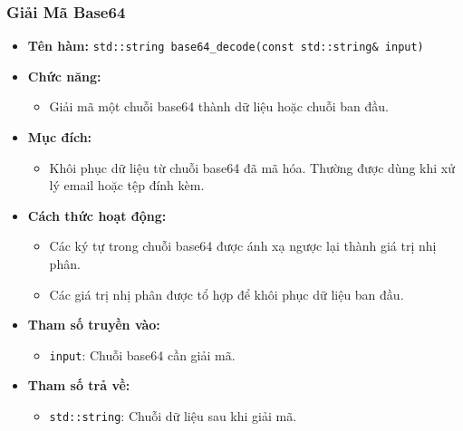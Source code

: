 \subsubsection{Giải Mã Base64}
\begin{itemize}
    \item \textbf{Tên hàm:} \texttt{std::string base64\_decode(const std::string\& input)}
    \item \textbf{Chức năng:} 
    \begin{itemize}
        \item Giải mã một chuỗi base64 thành dữ liệu hoặc chuỗi ban đầu.
    \end{itemize}
    \item \textbf{Mục đích:} 
    \begin{itemize}
        \item Khôi phục dữ liệu từ chuỗi base64 đã mã hóa. Thường được dùng khi xử lý email hoặc tệp đính kèm.
    \end{itemize}
    \item \textbf{Cách thức hoạt động:} 
    \begin{itemize}
        \item Các ký tự trong chuỗi base64 được ánh xạ ngược lại thành giá trị nhị phân.
        \item Các giá trị nhị phân được tổ hợp để khôi phục dữ liệu ban đầu.
    \end{itemize}
    \item \textbf{Tham số truyền vào:} 
    \begin{itemize}
        \item \texttt{input}: Chuỗi base64 cần giải mã.
    \end{itemize}
    \item \textbf{Tham số trả về:} 
    \begin{itemize}
        \item \texttt{std::string}: Chuỗi dữ liệu sau khi giải mã.
    \end{itemize}
\end{itemize}

